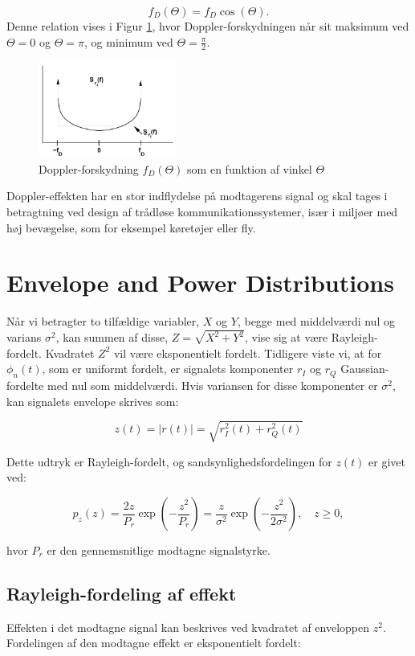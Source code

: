 \documentclass[a4paper,12pt]{book}
\begin{document}
	\[
	f_D(\Theta) = f_D \cos(\Theta).
	\]
	\noindent
	Denne relation vises i Figur \ref{fig:doppler_shift}, hvor Doppler-forskydningen når sit maksimum ved $\Theta = 0$ og $\Theta = \pi$, og minimum ved $\Theta = \frac{\pi}{2}$.
	
	\begin{figure}[h!]
		\centering
		\includegraphics[width=0.4\textwidth]{fig/fig22.png}
		\caption{Doppler-forskydning $f_D(\Theta)$ som en funktion af vinkel $\Theta$}
		\label{fig:doppler_shift}
	\end{figure}
	
	Doppler-effekten har en stor indflydelse på modtagerens signal og skal tages i betragtning ved design af trådløse kommunikationssystemer, især i miljøer med høj bevægelse, som for eksempel køretøjer eller fly.
	
	\section{Envelope and Power Distributions}
	Når vi betragter to tilfældige variabler, $X$ og $Y$, begge med middelværdi nul og varians $\sigma^2$, kan summen af disse, $Z = \sqrt{X^2 + Y^2}$, vise sig at være Rayleigh-fordelt. Kvadratet $Z^2$ vil være eksponentielt fordelt. Tidligere viste vi, at for $\phi_n(t)$, som er uniformt fordelt, er signalets komponenter $r_I$ og $r_Q$ Gaussian-fordelte med nul som middelværdi. Hvis variansen for disse komponenter er $\sigma^2$, kan signalets envelope skrives som:
	
	\[
	z(t) = |r(t)| = \sqrt{r_I^2(t) + r_Q^2(t)}
	\]
	
	Dette udtryk er Rayleigh-fordelt, og sandsynlighedsfordelingen for $z(t)$ er givet ved:
	
	\[
	p_z(z) = \frac{2z}{P_r} \exp\left(-\frac{z^2}{P_r}\right) = \frac{z}{\sigma^2} \exp\left(-\frac{z^2}{2\sigma^2}\right), \quad z \geq 0,
	\]
	
	hvor $P_r$ er den gennemsnitlige modtagne signalstyrke.
	
	\subsection{Rayleigh-fordeling af effekt}
	Effekten i det modtagne signal kan beskrives ved kvadratet af enveloppen $z^2$. Fordelingen af den modtagne effekt er eksponentielt fordelt:
	
\end{document}
